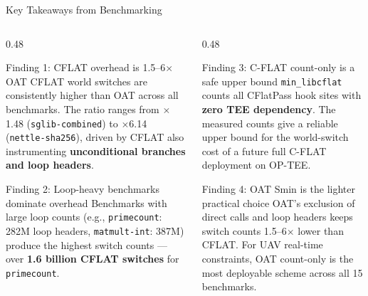 \documentclass[aspectratio=169, 10pt]{beamer}
\begin{document}
\begin{frame}{Key Takeaways from Benchmarking}
    \begin{columns}[T]
        \begin{column}{0.48\textwidth}
            \begin{greenbox}{Finding 1: CFLAT overhead is 1.5--6$\times$ OAT}
                CFLAT world switches are consistently higher than OAT across
                all benchmarks. The ratio ranges from $\times$1.48
                (\texttt{sglib-combined}) to $\times$6.14
                (\texttt{nettle-sha256}), driven by CFLAT also
                instrumenting \textbf{unconditional branches and loop headers}.
            \end{greenbox}
            \vspace{6pt}
            \begin{greenbox}{Finding 2: Loop-heavy benchmarks dominate overhead}
                Benchmarks with large loop counts (e.g.,
                \texttt{primecount}: 282M loop headers,
                \texttt{matmult-int}: 387M) produce the highest switch counts
                --- over \textbf{1.6 billion CFLAT switches} for
                \texttt{primecount}.
            \end{greenbox}
        \end{column}
        \begin{column}{0.48\textwidth}
            \begin{greenbox}{Finding 3: C-FLAT count-only is a safe upper bound}
                \texttt{min\_libcflat} counts all CFlatPass hook sites with
                \textbf{zero TEE dependency}. The measured counts give a
                reliable upper bound for the world-switch cost of a future
                full C-FLAT deployment on OP-TEE.
            \end{greenbox}
            \vspace{6pt}
            \begin{greenbox}{Finding 4: OAT Smin is the lighter practical choice}
                OAT's exclusion of direct calls and loop headers keeps switch
                counts 1.5--6$\times$ lower than CFLAT.
                For UAV real-time constraints, OAT count-only is the most
                deployable scheme across all 15 benchmarks.
            \end{greenbox}
        \end{column}
    \end{columns}
\end{frame}
\end{document}
